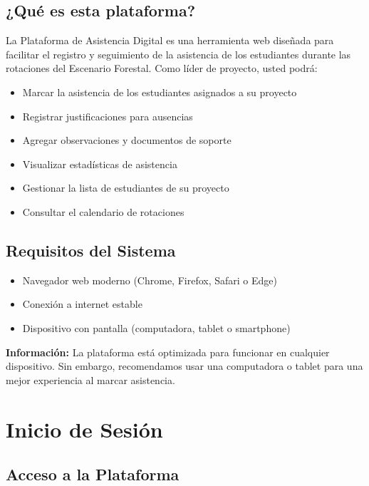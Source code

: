 \documentclass[11pt,a4paper]{article}
\begin{document}
\subsection{¿Qué es esta plataforma?}

La Plataforma de Asistencia Digital es una herramienta web diseñada para facilitar el registro y seguimiento de la asistencia de los estudiantes durante las rotaciones del Escenario Forestal. Como líder de proyecto, usted podrá:

\begin{itemize}
  \item Marcar la asistencia de los estudiantes asignados a su proyecto
  \item Registrar justificaciones para ausencias
  \item Agregar observaciones y documentos de soporte
  \item Visualizar estadísticas de asistencia
  \item Gestionar la lista de estudiantes de su proyecto
  \item Consultar el calendario de rotaciones
\end{itemize}

\subsection{Requisitos del Sistema}

\begin{itemize}
  \item Navegador web moderno (Chrome, Firefox, Safari o Edge)
  \item Conexión a internet estable
  \item Dispositivo con pantalla (computadora, tablet o smartphone)
\end{itemize}

\begin{infobox}
\textbf{Información:} La plataforma está optimizada para funcionar en cualquier dispositivo. Sin embargo, recomendamos usar una computadora o tablet para una mejor experiencia al marcar asistencia.
\end{infobox}

\section{Inicio de Sesión}

\subsection{Acceso a la Plataforma}
\end{document}
